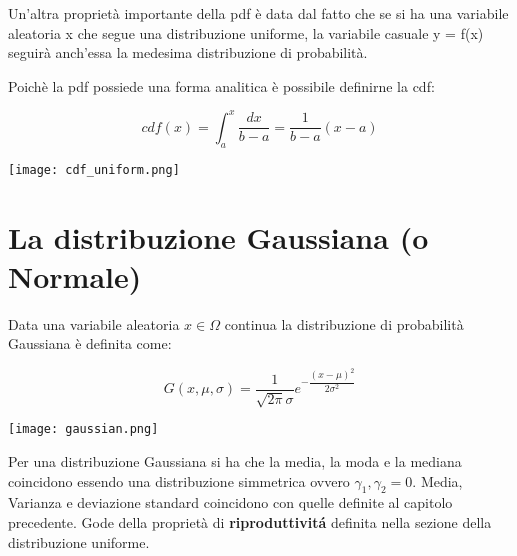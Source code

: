 Un'altra propriet\`{a} importante della pdf \`{e} data dal fatto che se si ha una variabile aleatoria x che segue una distribuzione uniforme, la variabile casuale y = f(x) seguir\`{a} anch'essa la medesima distribuzione di probabilit\`{a}.\newline

\noindent Poich\`{e} la pdf possiede una forma analitica \`{e} possibile definirne la cdf:



\vspace{0.3in}

  \begin{minipage}{0.5\textwidth}
  	\begin{equation*}
	cdf(x) = \int_{a}^{x}\dfrac{dx}{b-a} = \dfrac{1}{b-a}(x-a)
\end{equation*}
  \end{minipage}
  \begin{minipage}{.4\textwidth}
    \centering
    \texttt{[image: cdf\_uniform.png]}

  \end{minipage}
\vspace{0.3in}

\section{La distribuzione Gaussiana (o Normale)}

Data una variabile aleatoria $x \in \Omega $ continua la distribuzione di probabilit\`{a} Gaussiana \`{e} definita come:

\vspace{0.3in}

  \begin{minipage}{0.5\textwidth}
\begin{equation}
	G(x,\mu,\sigma) = \dfrac{1}{\sqrt{2\pi}\sigma} e^{-\dfrac{(x-\mu)^2}{2\sigma^2}}
\end{equation}
  \end{minipage}
  \begin{minipage}{.4\textwidth}
    \centering
    \texttt{[image: gaussian.png]}

  \end{minipage}
\vspace{0.3in}

Per una distribuzione Gaussiana si ha che la media, la moda e la mediana coincidono essendo una distribuzione simmetrica ovvero $\gamma_{1},\gamma_2 = 0$. Media, Varianza e deviazione standard coincidono con quelle definite al capitolo precedente. Gode della propriet\`{a} di \textbf{riproduttivit\'{a}} definita nella sezione della distribuzione uniforme.\newline

